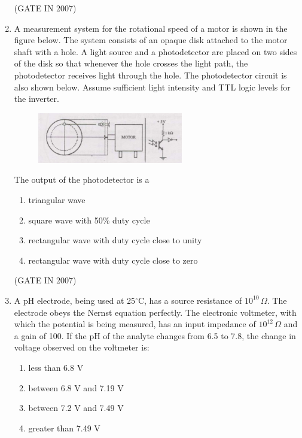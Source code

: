 \documentclass[journal]{IEEEtran}
\begin{document}
\begin{enumerate}
\hfill(GATE IN 2007)


\item A measurement system for the rotational speed of a motor is shown in the figure below. The system consists of an opaque disk attached to the motor shaft with a hole. A light source and a photodetector are placed on two sides of the disk so that whenever the hole crosses the light path, the photodetector receives light through the hole. The photodetector circuit is also shown below. Assume sufficient light intensity and TTL logic levels for the inverter.
\begin{figure}[H]
    \centering
      \includegraphics[width=0.6\textwidth]{29.jpg} 
      \caption{}
    \label{fig:fig29} 
\end{figure}
The output of the photodetector is a 
\begin{enumerate}
    \item triangular wave
    \item square wave with 50\% duty cycle
    \item rectangular wave with duty cycle close to unity
    \item rectangular wave with duty cycle close to zero
\end{enumerate}
\hfill(GATE IN 2007)

\item A pH electrode, being used at 25$^\circ$C, has a source resistance of $10^{10}\,\Omega$. The electrode obeys the Nernst equation perfectly. The electronic voltmeter, with which the potential is being measured, has an input impedance of $10^{12}\,\Omega$ and a gain of 100. If the pH of the analyte changes from 6.5 to 7.8, the change in voltage observed on the voltmeter is:

\begin{multicols}{2}
\begin{enumerate}
    \item less than 6.8 V
    \item between 6.8 V and 7.19 V
    \item between 7.2 V and 7.49 V
    \item greater than 7.49 V
\end{enumerate}
\end{multicols}


\end{enumerate}
\end{document}
